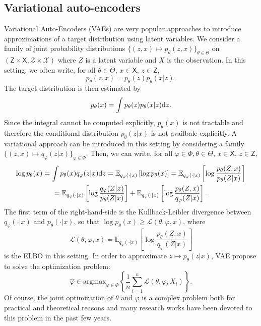 \documentclass[english,graybox,envcountchap,envcountsame,sectrefs,shortlabels]{svmono}
\theoremstyle{style}
\newcommand{\eqsp}{}
\begin{document}
\subsection{Variational auto-encoders}
Variational Auto-Encoders (VAEs) are very popular approaches to introduce approximations of a target distribution using latent variables. We consider a family of joint probability distributions $\{(z,x) \mapsto  p_{\theta}(z,x)\}_{\theta\in\Theta}$ on $(\mathsf{Z}\times \mathsf{X}, \mathcal{Z}\times \mathcal{X})$ where $Z$ is a latent variable and $X$ is the observation. In this setting, we often write, for all $\theta\in\Theta$, $x\in \mathsf{X}$, $z\in \mathsf{Z}$,
$$
p_{\theta}(z,x) = p_{\theta}(z)p_{\theta}(x|z)\eqsp.
$$
The target distribution is then estimated by
$$
p_\theta(x) = \int p_{\theta}(z)p_{\theta}(x|z)\rmd z\eqsp.
$$
Since the integral cannot be computed explicitly, $p_\theta(x)$ is not tractable and therefore the conditional distribution $p_{\theta}(z|x)$ is not availbale explicitly. A variational approach can be introduced in this setting by considering a family $\{(z,x) \mapsto q_{\varphi}(z|x)\}_{\varphi\in\Phi}$. Then, we can write, for all $\varphi\in\Phi,\theta\in\Theta$, $x\in\mathsf{X}$, $z\in\mathsf{Z}$,
\begin{multline*}
\log p_\theta(x) = \int p_\theta(x) q_{\varphi}(z|x) \mathrm{d} z = \mathbb{E}_{q_{\varphi}(\cdot|x)}\left[\log p_\theta(x)\right] = \mathbb{E}_{q_{\varphi}(\cdot|x)}\left[\log \frac{p_\theta(Z,x)}{p_\theta(Z|x)}\right] \\
= \mathbb{E}_{q_{\varphi}(\cdot|x)}\left[\log \frac{q_{\varphi}(Z|x)}{p_\theta(Z|x)}\right]  + \mathbb{E}_{q_{\varphi}(\cdot|x)}\left[\log \frac{p_\theta(Z,x)}{q_{\varphi}(Z|x)}\right] .
\end{multline*}
The first term of the right-hand-side is the Kullback-Leibler divergence between $q_{\varphi}(\cdot|x)$ and $p_\theta(\cdot|x)$, so that $\log p_\theta(x)\geq \mathcal{L}(\theta,\varphi,x)$, where
$$
\mathcal{L}(\theta,\varphi,x) = \mathbb{E}_{q_{\varphi}(\cdot|x)}\left[\log \frac{p_\theta(Z,x)}{q_{\varphi}(Z|x)}\right]
$$
is the ELBO in this setting. In order to approximate $z\mapsto p_\theta(z|x)$, VAE propose to solve the optimization problem:
$$
\widehat \varphi \in \mathrm{argmax}_{\varphi\in\Phi}\left\{ \frac{1}{n}\sum_{i=1}^n \mathcal{L}(\theta,\varphi,X_i)\right\}\eqsp.
$$
Of course, the joint optimization of $\theta$ and $\varphi$ is a complex problem both for practical and theoretical reasons and many research works have been devoted to this problem in the past few years.
\end{document}
